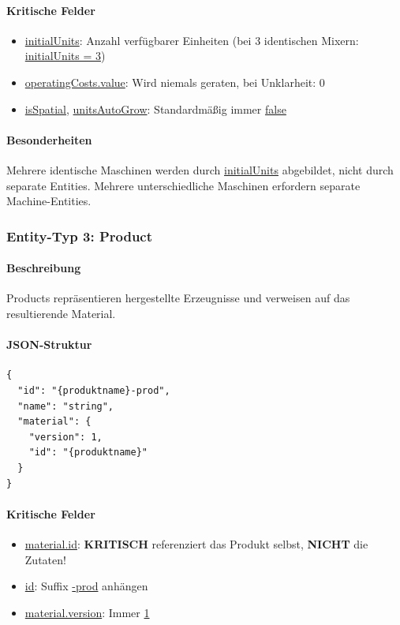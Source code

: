 \paragraph{Kritische Felder}

\begin{itemize}
    \item \url{initialUnits}: Anzahl verfügbarer Einheiten (bei 3 identischen Mixern: \url{initialUnits = 3})
    \item \url{operatingCosts.value}: Wird niemals geraten, bei Unklarheit: 0
    \item \url{isSpatial}, \url{unitsAutoGrow}: Standardmäßig immer \url{false}
\end{itemize}

\paragraph{Besonderheiten}

Mehrere identische Maschinen werden durch \url{initialUnits} abgebildet, nicht durch separate Entities. Mehrere unterschiedliche Maschinen erfordern separate Machine-Entities.

\subsubsection{Entity-Typ 3: Product}

\paragraph{Beschreibung}

Products repräsentieren hergestellte Erzeugnisse und verweisen auf das resultierende Material.

\paragraph{JSON-Struktur}

\begin{verbatim}
{
  "id": "{produktname}-prod",
  "name": "string",
  "material": {
    "version": 1,
    "id": "{produktname}"
  }
}
\end{verbatim}

\paragraph{Kritische Felder}

\begin{itemize}
    \item \url{material.id}: \textbf{KRITISCH} referenziert das Produkt selbst, \textbf{NICHT} die Zutaten!
    \item \url{id}: Suffix \url{-prod} anhängen
    \item \url{material.version}: Immer \url{1}
\end{itemize}

